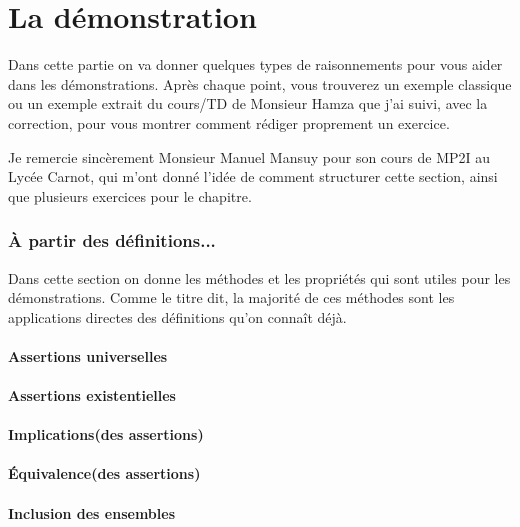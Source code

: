 \documentclass{article}
\begin{document}
\newpage
\part{La démonstration}

Dans cette partie on va donner quelques types de raisonnements pour vous aider dans les démonstrations. Après chaque point, vous trouverez un exemple classique ou un exemple extrait du cours/TD de Monsieur Hamza que j'ai suivi, avec la correction, pour vous montrer comment rédiger proprement un exercice.

Je remercie sincèrement Monsieur Manuel Mansuy pour son cours de MP2I au Lycée Carnot, qui m'ont donné l'idée de comment structurer cette section, ainsi que plusieurs exercices pour le chapitre.

\section{À partir des définitions...}

Dans cette section on donne les méthodes et les propriétés qui sont utiles pour les démonstrations. Comme le titre dit, la majorité de ces méthodes sont les applications directes des définitions qu'on connaît déjà.

\subsection{Assertions universelles}



\subsection{Assertions existentielles}



\subsection{Implications(des assertions)}



\subsection{Équivalence(des assertions)}



\subsection{Inclusion des ensembles}
\end{document}
